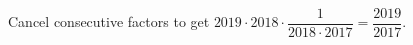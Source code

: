 Cancel consecutive factors to get $2019\cdot2018\cdot\dfrac{1}{2018\cdot2017}=\boxed{\dfrac{2019}{2017}}$.
